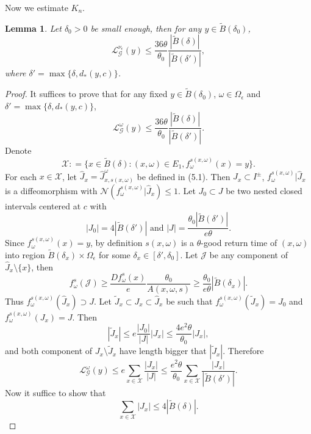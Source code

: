 \documentclass[11pt,oneside]{article}
\theoremstyle{plain}
\newtheorem{lem}{Lemma}[section]
\numberwithin{equation}{section}
\numberwithin{figure}{section}
\numberwithin{table}{section}
\begin{document}
Now we estimate $K_n$.


\begin{lem}
Let $\delta_0 > 0$ be small enough, then for any $y \in \tilde B(\delta_0)$, 
\[
\mathcal L_{\mathscr G}^{\nu_{\epsilon}} (y) \leq \frac{36 \theta}{\theta_0} \frac{|\tilde B(\delta)|}{|\tilde B(\delta')|},
\]
where $\delta' = \max \{ \delta, d_*(y, c)\}$.
\end{lem}


\begin{proof}

It suffices to prove that for any fixed $y \in \tilde B(\delta_0)$, $\omega \in \Omega_{\epsilon}$ and $\delta' = \max \{ \delta, d_*(y, c)\}$, 
\[
\mathcal L_{\mathscr G}^{\omega} (y) \leq \frac{36 \theta}{\theta_0} \frac{|\tilde B(\delta)|}{|\tilde B(\delta')|}.
\]
Denote
\[
\mathcal X : = \{x \in \tilde B(\delta) : (x, \omega)\in E_1, f_{\omega}^{s(x, \omega)} (x) = y \}.
\]
For each $x \in \mathcal X$, let $\hat J_x = \hat J_{x, s(x, \omega)}^{\omega}$ be defined in (5.1). Then $\hat J_x \subset I^{\pm}$,  $f_{\omega}^{s(x, \omega)} | \hat J_x$ is a diffeomorphism with $\mathcal N (f_{\omega}^{s(x, \omega)} | \hat J_x) \leq 1$. Let $J_0 \subset J$ be two nested closed intervals centered at $c$ with 
 \[
 |J_0| = 4 |\tilde B(\delta')| \mbox{ and \ } |J| = \frac{\theta_0  |\tilde B(\delta')|}{e \theta}.
 \]
 Since $f_{\omega}^{s(x, \omega)} (x) = y$, by definition $s(x, \omega)$ is a $\theta$-good return time of $(x, \omega)$ into region $\tilde B(\delta_x) \times \Omega_{\epsilon}$ for some $\delta_x \in [\delta', \delta_0]$. Let $\mathcal J$ be any component of $\hat J_x \setminus \{ x\}$, then
\[
 f_{\omega}^s(\mathcal J) \geq \frac{Df_{\omega}^s(x)}{e}  \frac{\theta_0}{A(x, \omega, s)} \geq \frac{\theta_0}{e \theta} |\tilde B(\delta_x)|.
\]
Thus $f_{\omega}^{s(x, \omega)}(\hat J_x) \supset J$. Let $\tilde J_x \subset J_x \subset \hat J_x$ be such that $f_{\omega}^{s(x, \omega)}(\tilde J_x) = J_0$ and $f_{\omega}^{s(x, \omega)}(J_x) = J$. Then
 \begin{equation}
 |\tilde J_x| \leq e \frac{|J_0|}{|J|} |J_x| \leq \frac{4 e^2 \theta}{\theta_0} |J_x|,
 \end{equation}
 and both component of $J_x \setminus \tilde J_x$ have length bigger that $|\tilde J_x|$. Therefore 
\[
\mathcal L_{\mathscr G}^{\omega} (y) \leq e \sum_{x \in \mathcal X} \frac{|J_x|}{|J|} \leq \frac{e^2 \theta}{\theta_0} \sum_{x \in \mathcal X} \frac{|J_x|}{|\tilde B(\delta')|}.
\]
Now it suffice to show that 
\begin{equation}
\sum_{x \in \mathcal X} |J_x| \leq 4 |\tilde B(\delta)|.
\end{equation}



\end{proof}
\end{document}
